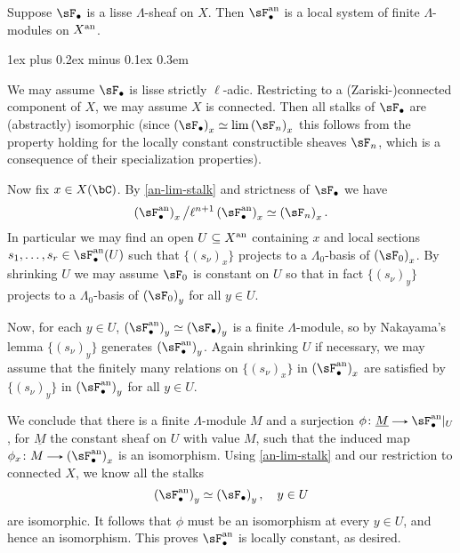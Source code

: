 \documentclass[11pt,leqno]{article}
\makeatletter
\newcommand{\thmheadfont}{\scshape}
\newcommand{\thmhorizspace}{0.3em}
\newcommand{\thmsep}{\hspace{\thmhorizspace}---}
\renewenvironment{proof}[1][Proof]{\par
  \pushQED{\qed}%
  \normalfont%
  \topsep1ex plus 0.2ex minus 0.1ex\relax%
  \labelsep \thmhorizspace\relax%
  \trivlist
  \item[\hskip\labelsep\thmheadfont#1\@addpunct{\thmsep}]\ignorespaces
}{%
  \popQED\endtrivlist\@endpefalse%
}
\theoremstyle{block}
\numberwithin{subblock}{block}
\numberwithin{equation}{subblock}
\newcommand{\arrlen}{1.25em}
\renewcommand{\to}{\mathrel{\tikz[baseline]%
    \draw[>=stealth,->](0,0.5ex)--(\arrlen,0.5ex);}}
\renewcommand{\l}{\left}
\renewcommand{\r}{\right}
\renewcommand{\u}{\underline}
\renewcommand{\c}{\colon}
\newcommand{\iso}{\simeq}
\numberwithin{block}{section}
\makeatother
\begin{document}
\begin{corollary}
  \label{an-lisse-local}
  Suppose $\sF_\bullet$ is a lisse $\Lambda$-sheaf on $X$. Then $\sF_\bullet^\an$ is a local system of finite $\Lambda$-modules on $X^{\mathrm{an}}$.

  \begin{proof}
    We may assume $\sF_\bullet$ is lisse strictly $\ell$-adic. Restricting to a (Zariski-)connected component of $X$, we may assume $X$ is connected. Then all stalks of $\sF_\bullet$ are (abstractly) isomorphic (since $\l(\sF_\bullet\r)_x \iso \lim {\l(\sF_n\r)_x}$ this follows from the property holding for the locally constant constructible sheaves $\sF_n$, which is a consequence of their specialization properties).

    Now fix $x \in X(\bC)$. By \cref{an-lim-stalk} and strictness of $\sF_\bullet$ we have
    \[
      \l(\sF_\bullet^\an\r)_x \big/ \ell^{n+1} \l(\sF_\bullet^\an\r)_x \iso \l(\sF_n\r)_x.
    \]
    In particular we may find an open $U \subseteq X^{\mathrm{an}}$ containing $x$ and local sections $s_1,\ldots,s_r \in \sF_\bullet^\an(U)$ such that $\{(s_\nu)_x\}$ projects to a $\Lambda_0$-basis of $\l(\sF_0\r)_x$. By shrinking $U$ we may assume $\sF_0$ is constant on $U$ so that in fact $\{(s_\nu)_y\}$ projects to a $\Lambda_0$-basis of $\l(\sF_0\r)_y$ for all $y \in U$.

    Now, for each $y \in U$, $\l(\sF_\bullet^\an\r)_y \iso \l(\sF_\bullet\r)_y$ is a finite $\Lambda$-module, so by Nakayama's lemma $\{(s_\nu)_y\}$ generates $\l(\sF_\bullet^\an\r)_y$. Again shrinking $U$ if necessary, we may assume that the finitely many relations on $\{(s_\nu)_x\}$ in $\l(\sF_\bullet^\an\r)_x$ are satisfied by $\{(s_\nu)_y\}$ in $\l(\sF_\bullet^\an\r)_y$ for all $y \in U$.

    We conclude that there is a finite $\Lambda$-module $M$ and a surjection $\phi \c \u M \to \sF_\bullet^\an|_U$, for $\u M$ the constant sheaf on $U$ with value $M$, such that the induced map $\phi_x \c M \to \l(\sF^\an_\bullet\r)_x$ is an isomorphism. Using \cref{an-lim-stalk} and our restriction to connected $X$, we know all the stalks
    \[
      \l(\sF_\bullet^\an\r)_y \iso \l(\sF_\bullet\r)_y, \quad y \in U
    \]
    are isomorphic. It follows that $\phi$ must be an isomorphism at every $y \in U$, and hence an isomorphism. This proves $\sF_\bullet^\an$ is locally constant, as desired.
  \end{proof}
\end{corollary}
\end{document}
